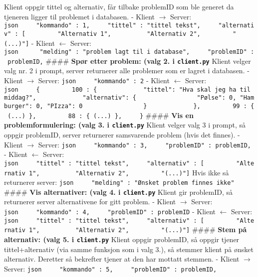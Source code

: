 Klient oppgir tittel og alternativ, får tilbake problemID som ble
generet da tjeneren ligger til problemet i databasen. - Klient
\(\rightarrow\) Server:
\texttt{json\ \ \ \ \ "kommando"\ :\ 1,\ \ \ \ \ "tittel"\ :\ "tittel\ tekst",\ \ \ \ \ "alternativ"\ :\ {[}\ \ \ \ \ \ \ \ \ "Alternativ\ 1",\ \ \ \ \ \ \ \ \ \ "Alternativ\ 2",\ \ \ \ \ \ \ \ \ "(...)"{]}}
- Klient \(\leftarrow\) Server:
\texttt{json\ \ \ \ \ \ "melding"\ :\ "problem\ lagt\ til\ i\ database",\ \ \ \ \ "problemID"\ :\ problemID,}
\#\#\#\# \textbf{Spør etter problem: (valg 2. i \texttt{client.py}}
Klient velger valg nr. 2 i prompt, server returnerer alle problemer som
er lagret i databasen. - Klient \(\rightarrow\) Server:
\texttt{json\ \ \ \ \ "kommando"\ :\ 2} - Klient \(\leftarrow\) Server:
\texttt{json\ \ \ \ \ \{\ \ \ \ \ \ \ \ \ 100\ :\ \{\ \ \ \ \ \ \ \ \ \ \ \ \ "tittel":\ "Hva\ skal\ jeg\ ha\ til\ middag?",\ \ \ \ \ \ \ \ \ \ \ \ \ "alternativ":\ \{\ \ \ \ \ \ \ \ \ \ \ \ \ \ \ \ \ "Pølse":\ 0,\ "Hamburger":\ 0,\ "PIzza":\ 0\ \ \ \ \ \ \ \ \ \ \ \ \ \ \ \ \ \}\ \ \ \ \ \ \ \ \ \ \ \ \ \},\ \ \ \ \ \ \ \ \ 99\ :\ \{\ (...)\ \},\ \ \ \ \ \ \ \ \ 88\ :\ \{\ (...)\ \},\ \ \ \ \ \}}
\#\#\#\# \textbf{Vis en problemformulering: (valg 3. i
\texttt{client.py}} Klient velger valg 3 i prompt, så oppgir problemID,
server returnerer samsvarende problem (hvis det finnes). - Klient
\(\rightarrow\) Server:
\texttt{json\ \ \ \ \ "kommando"\ :\ 3,\ \ \ \ \ "problemID"\ :\ problemID,}
- Klient \(\leftarrow\) Server:
\texttt{json\ \ \ \ \ "tittel"\ :\ "tittel\ tekst",\ \ \ \ \ "alternativ"\ :\ {[}\ \ \ \ \ \ \ \ \ "Alternativ\ 1",\ \ \ \ \ \ \ \ \ \ "Alternativ\ 2",\ \ \ \ \ \ \ \ \ "(...)"{]}}
Hvis ikke så returnerer server:
\texttt{json\ \ \ \ \ "melding"\ :\ "Ønsket\ problem\ finnes\ ikke"}
\#\#\#\# \textbf{Vis alternativer: (valg 4. i \texttt{client.py}} Klient
gir problemID, så returnerer server alternativene for gitt problem. -
Klient \(\rightarrow\) Server:
\texttt{json\ \ \ \ \ "kommando"\ :\ 4,\ \ \ \ \ "problemID"\ :\ problemID}
- Klient \(\leftarrow\) Server:
\texttt{json\ \ \ \ \ "tittel"\ :\ "tittel\ tekst",\ \ \ \ \ "alternativ"\ :\ {[}\ \ \ \ \ \ \ \ \ "Alternativ\ 1",\ \ \ \ \ \ \ \ \ \ "Alternativ\ 2",\ \ \ \ \ \ \ \ \ "(...)"{]}}
\#\#\#\# \textbf{Stem på alternativ: (valg 5. i \texttt{client.py}}
Klient oppgir problemID, så oppgir tjener tittel+alternativ (via samme
funksjon som i valg 3.), så stemmer klient på ønsket alternativ.
Deretter så bekrefter tjener at den har mottatt stemmen. - Klient
\(\rightarrow\) Server:
\texttt{json\ \ \ \ \ "kommando"\ :\ 5,\ \ \ \ \ "problemID"\ :\ problemID,}
